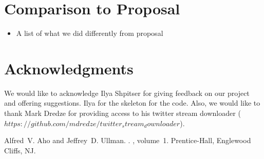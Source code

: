\documentclass[11pt,letterpaper]{article}
\begin{document}
\section{Comparison to Proposal}

\begin{itemize}
\item A list of what we did differently from proposal
\end{itemize}

\section*{Acknowledgments}
We would like to acknowledge Ilya Shpitser for giving feedback on our project and offering suggestions. Ilya for the skeleton for the code.
Also, we would like to thank Mark Dredze for providing access to his twitter stream downloader ($https://github.com/mdredze/twitter_stream_downloader$).

\begin{thebibliography}{}

Alfred~V. Aho and Jeffrey~D. Ullman.
.
, volume~1.
\newblock Prentice-{Hall}, Englewood Cliffs, NJ.

\end{thebibliography}
\end{document}
